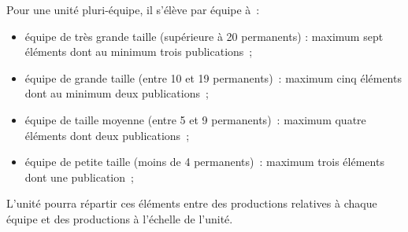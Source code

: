 \documentclass[]{article}
\begin{document}
{Pour une unité pluri-équipe, il s’élève par équipe à :
\begin{itemize}
\item équipe de très grande taille (supérieure à 20 permanents) : maximum sept éléments dont au minimum trois publications ;
\item équipe de grande taille (entre 10 et 19 permanents) : maximum cinq éléments dont au minimum deux publications ;
\item équipe de taille moyenne (entre 5 et 9 permanents) : maximum quatre éléments dont deux publications ;
\item équipe de petite taille (moins de 4 permanents) : maximum trois éléments dont une publication ;
\end{itemize}

L’unité pourra répartir ces éléments entre des productions relatives à chaque équipe et des productions à l’échelle de l’unité.

}
\end{document}
